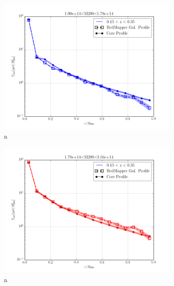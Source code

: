 \documentclass[twocolumn]{article}
\begin{document}
\begin{figure}
  \begin{subfigure}{.5\textwidth}
    \centering\includegraphics[width=1.0\linewidth]{figs/cfn/basic_rd_rm.param/plot_zmrs.py/fig2.png}
    \caption{a}
  \end{subfigure}
  \begin{subfigure}{.5\textwidth}
    \centering\includegraphics[width=1.0\linewidth]{figs/cfn/basic_rd_rm.param/plot_zmrs.py/fig3.png}
    \caption{a}
  \end{subfigure}
  \begin{subfigure}{.5\textwidth}

\end{subfigure}
\end{figure}
\end{document}
